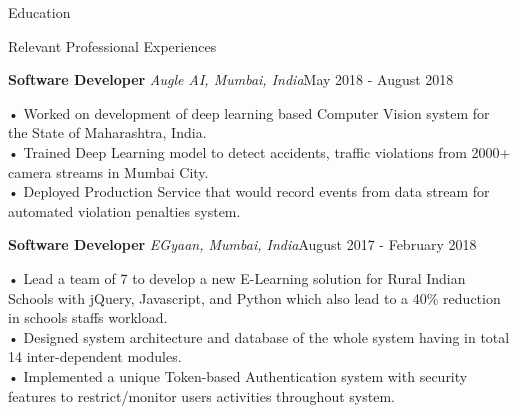 \documentclass{resume} %
\begin{document}
\begin{rSection}{Education}
\begin{rSection}{Relevant Professional Experiences}
\begin{addmargin}[0.5em]{0em}
\end{addmargin} \vspace{-1.7em}
\textbf{Software Developer } \textit{Augle AI, Mumbai, India}\hfill May 2018 - August 2018 \\
\vspace{-1.7em} \begin{addmargin}[0.5em]{0em}
• Worked on development of deep learning based Computer Vision system for the State of Maharashtra, India.\\
• Trained Deep Learning model to detect accidents, traffic violations from 2000+ camera streams in Mumbai City. \\
• Deployed Production Service that would record events from data stream for automated violation penalties system.\\
\end{addmargin} \vspace{-1.7em}
\textbf{Software Developer } \textit{EGyaan, Mumbai, India}\hfill August 2017 - February 2018 \\
\vspace{-1.7em} \begin{addmargin}[0.5em]{0em}
• Lead a team of 7 to develop a new E-Learning solution for Rural Indian Schools with jQuery, Javascript, and Python which also lead to a 40\% reduction in schools staffs workload. \\
• Designed system architecture and database of the whole system having in total 14 inter-dependent modules.\\
• Implemented a unique Token-based Authentication system with security features to restrict/monitor users activities throughout system. \\
\end{addmargin} 
\end{rSection} 


\end{rSection}
\end{document}
